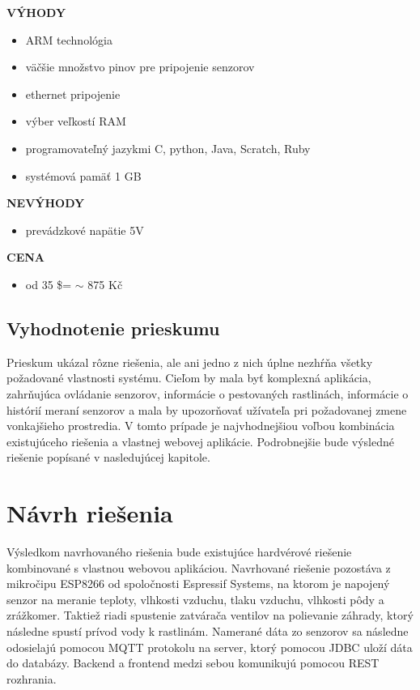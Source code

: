 \documentclass[twoside]{ctuthesis}
\theoremstyle{plain}
\theoremstyle{definition}
\theoremstyle{note}
\begin{document}
\textbf{VÝHODY}
\begin{itemize}
\item ARM technológia
\item väčšie množstvo pinov pre pripojenie senzorov
\item ethernet pripojenie
\item výber veľkostí RAM
\item programovateľný jazykmi C, python, Java, Scratch, Ruby
\item systémová pamäť 1 GB
\end{itemize}

\textbf{NEVÝHODY}
\begin{itemize}
\item prevádzkové napätie 5V
\end{itemize}

\textbf{CENA}
\begin{itemize}
\item od 35 \$= $\sim$ 875 Kč
\end{itemize}

\section{Vyhodnotenie prieskumu}
Prieskum ukázal rôzne riešenia, ale ani jedno z nich úplne nezhŕňa všetky požadované vlastnosti systému. Cieľom by mala byť komplexná aplikácia, zahrňujúca ovládanie senzorov, informácie o pestovaných rastlinách, informácie o histórií meraní senzorov a mala by upozorňovať užívateľa pri požadovanej zmene vonkajšieho prostredia. V tomto prípade je najvhodnejšiou voľbou kombinácia existujúceho riešenia a vlastnej webovej aplikácie. Podrobnejšie bude výsledné riešenie popísané v nasledujúcej kapitole.

\chapter{Návrh riešenia}

Výsledkom navrhovaného riešenia bude existujúce hardvérové riešenie kombinované s vlastnou webovou aplikáciou. Navrhované riešenie pozostáva z mikročipu ESP8266 od spoločnosti Espressif Systems, na ktorom je napojený senzor na meranie teploty, vlhkosti vzduchu, tlaku vzduchu, vlhkosti pôdy a zrážkomer. Taktiež riadi spustenie zatvárača ventilov na polievanie záhrady, ktorý následne spustí prívod vody k rastlinám. Namerané dáta zo senzorov sa následne odosielajú pomocou MQTT protokolu na server, ktorý pomocou JDBC uloží dáta do databázy. Backend a frontend medzi sebou komunikujú pomocou REST rozhrania.
\end{document}

